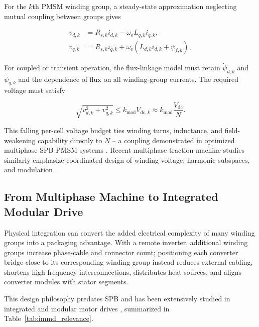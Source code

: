 For the $k$th PMSM winding group, a steady-state approximation
neglecting mutual coupling between groups gives

\begin{equation}
\begin{aligned}
v_{d,k}&=R_{s,k}i_{d,k}-\omega_{\mathrm e}L_{q,k}i_{q,k},\\
v_{q,k}&=R_{s,k}i_{q,k}
+\omega_{\mathrm e}\left(L_{d,k}i_{d,k}+\psi_{f,k}\right),
\end{aligned}
\label{eq:spb_machine_dq}
\end{equation}

For coupled or transient operation, the flux-linkage model must retain
$\dot\psi_{d,k}$ and $\dot\psi_{q,k}$ and the dependence of flux on
all winding-group currents. The required voltage must satisfy

\begin{equation}
\sqrt{v_{d,k}^{2}+v_{q,k}^{2}}
\leq
k_{\mathrm{mod}}V_{\mathrm{dc},k}
\approx
k_{\mathrm{mod}}\frac{V_{\mathrm{dc}}}{N}.
\label{eq:spb_machine_voltage_limit}
\end{equation}

This falling per-cell voltage budget ties winding turns, inductance,
and field-weakening capability directly to $N$ -- a coupling
demonstrated in optimized multiphase SPB-PMSM systems
\cite{Bringezu2020SPB}. Recent multiphase traction-machine studies
similarly emphasize coordinated design of winding voltage, harmonic
subspaces, and modulation
\cite{Chen2026HighModulationDTP,Feng2026TractionMachine}.

\subsection{From Multiphase Machine to Integrated Modular Drive}

Physical integration can convert the added electrical complexity of
many winding groups into a packaging advantage. With a remote
inverter, additional winding groups increase phase-cable and connector
count; positioning each converter bridge close to its corresponding
winding group instead reduces external cabling, shortens
high-frequency interconnections, distributes heat sources, and aligns
converter modules with stator segments.

This design philosophy predates SPB and has been extensively studied
in integrated and modular motor drives
\cite{Shakweh2002PlugPlayIMD,Wheeler2005Integrated30kW,Pickering2006ThermalIMD,Brown2007IMMD,Wolmarans2008IntegratedFT,Hennen2012DistributedIMMD,Choi2011IMMD,Wang2013GaNIMMD,Wang2015GaNIMMD,Wang2025GaNIMMD,Ugur2018GaNIMMD,Ugur2019MultiphysicsIMMD,Mohamed2021Electrothermal,Mohamed2021EnhancedIMD,Mohamed2022IntegratedDCLink,Chen2026WBGIMD,Deng2026IMDReview}, summarized in
Table~\ref{tab:immd_relevance}.

